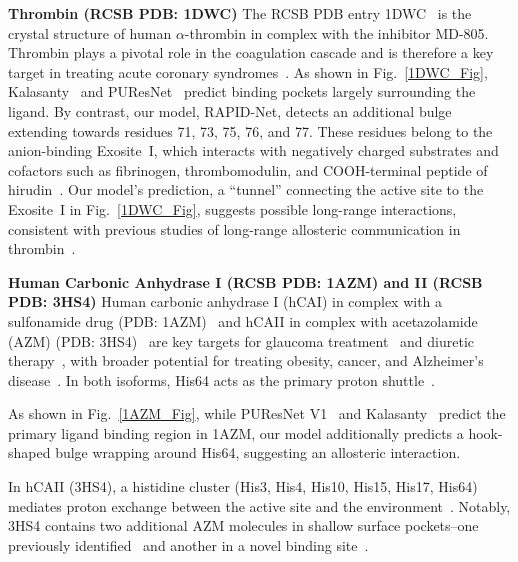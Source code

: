 \documentclass[10pt,conference]{IEEEtran}
\begin{document}
\noindent 
 \textbf{Thrombin (RCSB PDB: 1DWC)} The RCSB PDB entry 1DWC~\cite{banner1991crystallographic} is the crystal structure of human $\alpha$-thrombin in complex with the inhibitor MD-805. Thrombin plays a pivotal role in the coagulation cascade and is therefore a key target in treating acute coronary syndromes~\cite{weitz2002direct}. As shown in Fig.~\ref{1DWC_Fig}, Kalasanty~\cite{stepniewska2020improving} and PUResNet~\cite{kandel2021puresnet} predict binding pockets largely surrounding the ligand. By contrast, our model, RAPID-Net, detects an additional bulge extending towards residues 71, 73, 75, 76, and 77. These residues belong to the anion-binding Exosite~\rm{I}, which interacts with negatively charged substrates and cofactors such as fibrinogen, thrombomodulin, and COOH-terminal peptide of hirudin~\cite{crawley2007central,adams2006thrombin,bock2007exosites,troisi2021exosite,petrera2009long}. Our model's prediction, a ``tunnel'' connecting the active site to the Exosite~\rm{I} in Fig.~\ref{1DWC_Fig}, suggests possible long-range interactions, consistent with previous studies of long-range allosteric communication in thrombin~\cite{petrera2009long}.

\vspace{1em}
\noindent
\textbf{Human Carbonic Anhydrase I (RCSB PDB: 1AZM) and II (RCSB PDB: 3HS4)} Human carbonic anhydrase \rm{I} (hCA\rm{I}) in complex with a sulfonamide drug (PDB: 1AZM)~\cite{chakravarty1994drug} and hCA\rm{II} in complex with acetazolamide (AZM) (PDB: 3HS4)~\cite{sippel2009high} are key targets for glaucoma treatment~\cite{pfeiffer2001glaucoma} and diuretic therapy~\cite{supuran2008carbonic}, with broader potential for treating obesity, cancer, and Alzheimer’s disease~\cite{supuran2008carbonic}. In both isoforms, His64 acts as the primary proton shuttle~\cite{silverman1988catalytic,nair1991unexpected,lomelino2018crystallography}. 

As shown in Fig.~\ref{1AZM_Fig}, while PUResNet V1~\cite{kandel2021puresnet} and Kalasanty~\cite{stepniewska2020improving} predict the primary ligand binding region in 1AZM, our model additionally predicts a hook-shaped bulge wrapping around His64, suggesting an allosteric interaction.

In hCA\rm{II} (3HS4), a histidine cluster (His3, His4, His10, His15, His17, His64) mediates proton exchange between the active site and the environment~\cite{supuran2008carbonic}. Notably, 3HS4 contains two additional AZM molecules in shallow surface pockets--one previously identified~\cite{jude2006ultrahigh,srivastava2007structural} and another in a novel binding site~\cite{sippel2009high}. 
\end{document}
